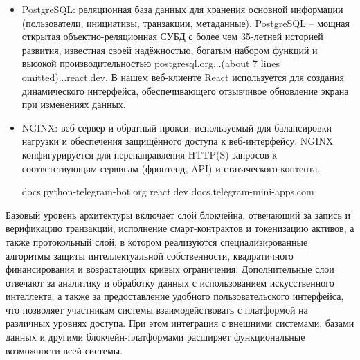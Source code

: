 \documentclass[
    14pt,
    specialist,
    candidate, %
    subf, %
    href,
    dotsinheaders=false
]{disser}
\begin{document}
\begin{itemize}
\item PostgreSQL: реляционная база данных для хранения основной информации (пользователи, инициативы, транзакции, метаданные). PostgreSQL – мощная открытая объектно-реляционная СУБД с более чем 35-летней историей развития, известная своей надёжностью, богатым набором функций и высокой производительностью postgresql.org...(about 7 lines omitted)...react.dev. В нашем веб-клиенте React используется для создания динамического интерфейса, обеспечивающего отзывчивое обновление экрана при изменениях данных.

\item NGINX: веб-сервер и обратный прокси, используемый для балансировки нагрузки и обеспечения защищённого доступа к веб-интерфейсу. NGINX конфигурируется для перенаправления HTTP(S)-запросов к соответствующим сервисам (фронтенд, API) и статического контента.

docs.python-telegram-bot.org
react.dev
docs.telegram-mini-apps.com

\end{itemize}

Базовый уровень архитектуры включает слой блокчейна, отвечающий за запись и верификацию транзакций, исполнение смарт-контрактов и токенизацию активов, а также протокольный слой, в котором реализуются специализированные алгоритмы защиты интеллектуальной собственности, квадратичного финансирования и возрастающих кривых ограничения. Дополнительные слои отвечают за аналитику и обработку данных с использованием искусственного интеллекта, а также за предоставление удобного пользовательского интерфейса, что позволяет участникам системы взаимодействовать с платформой на различных уровнях доступа. При этом интеграция с внешними системами, базами данных и другими блокчейн-платформами расширяет функциональные возможности всей системы.
\end{document}
